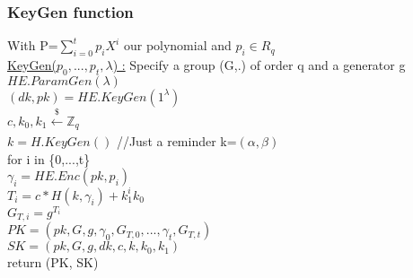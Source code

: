\subsubsection{KeyGen function}
With P=$\sum_{i=0}^{t}p_i X^i$ our polynomial and $p_i \in R_q$ \\
\underline{KeyGen($p_0,...,p_t, \lambda$) :} 
\tabNormal Specify a group (G,.) of order q and a generator g
\tabNormal $HE.ParamGen(\lambda)$ \\
\tabNormal $(dk, pk) = HE.KeyGen(1^\lambda)$ \\
\tabNormal $c,k_0,k_1 \xleftarrow[]{\$} \mathbb{Z}_q$ \\
\tabNormal $k=H.KeyGen()$ //Just a reminder k=$(\alpha,\beta)$\\
\tabNormal for i in \{0,...,t\} \\
\tabOne $\gamma_i = HE.Enc(pk, p_i)$ \\
\tabOne $T_i = c*H(k, \gamma_i) + k_1^i k_0$ \\
\tabOne $G_{T,i} = g^{T_i}$ \\
\tabNormal $PK = (pk, G, g, \gamma_0, G_{T,0},..., \gamma_t, G_{T,t})$ \\
\tabNormal $SK = (pk, G, g, dk, c, k, k_0, k_1 )$ \\
\tabNormal return (PK, SK)  \\
